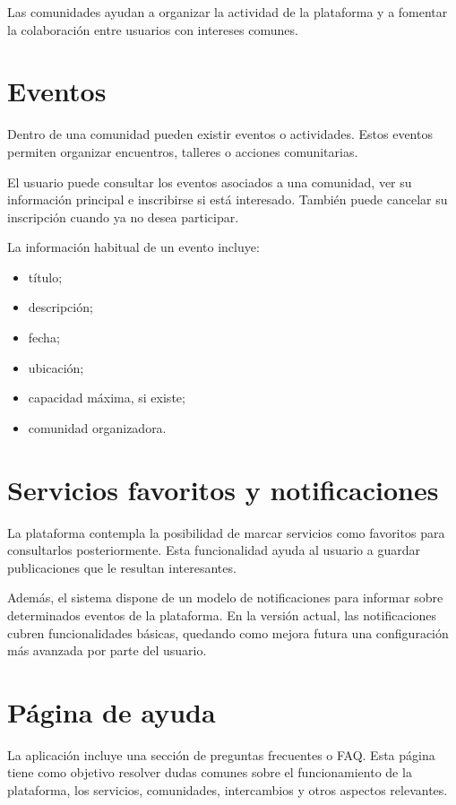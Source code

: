 Las comunidades ayudan a organizar la actividad de la plataforma y a fomentar la colaboración entre usuarios con intereses comunes.

\section{Eventos}

Dentro de una comunidad pueden existir eventos o actividades. Estos eventos permiten organizar encuentros, talleres o acciones comunitarias.

El usuario puede consultar los eventos asociados a una comunidad, ver su información principal e inscribirse si está interesado. También puede cancelar su inscripción cuando ya no desea participar.

La información habitual de un evento incluye:

\begin{itemize}
    \item título;
    \item descripción;
    \item fecha;
    \item ubicación;
    \item capacidad máxima, si existe;
    \item comunidad organizadora.
\end{itemize}

\section{Servicios favoritos y notificaciones}

La plataforma contempla la posibilidad de marcar servicios como favoritos para consultarlos posteriormente. Esta funcionalidad ayuda al usuario a guardar publicaciones que le resultan interesantes.

Además, el sistema dispone de un modelo de notificaciones para informar sobre determinados eventos de la plataforma. En la versión actual, las notificaciones cubren funcionalidades básicas, quedando como mejora futura una configuración más avanzada por parte del usuario.

\section{Página de ayuda}

La aplicación incluye una sección de preguntas frecuentes o FAQ. Esta página tiene como objetivo resolver dudas comunes sobre el funcionamiento de la plataforma, los servicios, comunidades, intercambios y otros aspectos relevantes.

